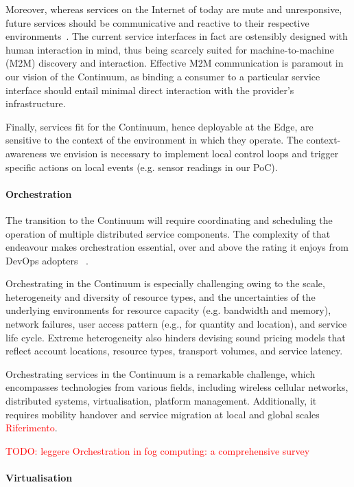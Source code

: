 Moreover, whereas services on the Internet of today are mute and unresponsive, future services should be communicative and reactive to their respective environments~\cite{haller2008internet}. 
The current service interfaces in fact are ostensibly designed with human interaction in mind, thus being scarcely suited for machine-to-machine (M2M) discovery and interaction. Effective M2M communication is paramout in our vision of the Continuum, as binding a consumer to a particular service interface should entail minimal direct interaction with the provider's infrastructure.

Finally, services fit for the Continuum, hence deployable at the Edge, are sensitive to the context of the environment in which they operate.
The context-awareness we envision is necessary to implement local control loops and trigger specific actions on local events (e.g. sensor readings in our PoC).

\paragraph{Orchestration}\label{p:orchestration}
The transition to the Continuum will require coordinating and scheduling the operation of multiple distributed service components. The complexity of that endeavour makes orchestration essential, over and above the rating it enjoys from DevOps adopters~ \textcolor{red}{\cite{nygren2010akamai}}. 

Orchestrating in the Continuum is especially challenging owing to the scale, heterogeneity and diversity of resource types, and the uncertainties of the underlying environments for resource capacity (e.g. bandwidth and memory), network failures, user access pattern (e.g., for quantity and location), and service life cycle.
Extreme heterogeneity also hinders devising sound pricing models that reflect account locations, resource types, transport volumes, and service latency.

Orchestrating services in the Continuum is a remarkable challenge, which encompasses technologies from various fields, including wireless cellular networks, distributed systems, virtualisation, platform management. Additionally, it requires mobility handover and service migration at local and global scales \textcolor{red}{Riferimento}.

\textcolor{red}{TODO: leggere Orchestration in fog computing: a comprehensive survey}

\paragraph{Virtualisation}\label{p:virtualisation}
\label{sec:virtualisation}

